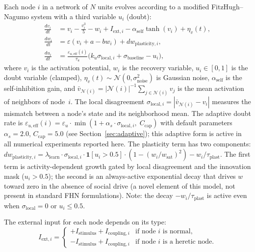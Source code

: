 ﻿\documentclass[11pt]{article}
\begin{document}
Each node $i$ in a network of $N$ units evolves according to a modified FitzHugh--Nagumo system with a third variable $u_i$ (doubt):
\begin{align}
\frac{dv_i}{dt} &= v_i - \frac{v_i^3}{5} - w_i + I_{\text{ext},i} - \alpha_{\text{self}} \tanh(v_i) + \eta_v(t), \label{eq:dv} \\
\frac{dw_i}{dt} &= \varepsilon(v_i + a - bw_i) + dw_{\text{plasticity},i}, \label{eq:dw} \\
\frac{du_i}{dt} &= \frac{\varepsilon_{u,\text{eff}}(i)}{\tau_u}\bigl(k_u \sigma_{\text{local},i} + \sigma_{\text{baseline}} - u_i\bigr), \label{eq:du}
\end{align}
where $v_i$ is the activation potential, $w_i$ is the recovery variable, $u_i \in [0, 1]$ is the doubt variable (clamped), $\eta_v(t) \sim \mathcal{N}(0, \sigma_{\text{noise}}^2)$ is Gaussian noise, $\alpha_{\text{self}}$ is the self-inhibition gain, and $\bar{v}_{\mathcal{N}(i)} = |\mathcal{N}(i)|^{-1} \sum_{j \in \mathcal{N}(i)} v_j$ is the mean activation of neighbors of node~$i$. The local disagreement $\sigma_{\text{local},i} = |\bar{v}_{\mathcal{N}(i)} - v_i|$ measures the mismatch between a node's state and its neighborhood mean. The adaptive doubt rate is $\varepsilon_{u,\text{eff}}(i) = \varepsilon_u \cdot \min(1 + \alpha_s \cdot \sigma_{\text{local},i},\; C_{\text{cap}})$ with default parameters $\alpha_s = 2.0$, $C_{\text{cap}} = 5.0$ (see Section~\ref{sec:adaptive}); this adaptive form is active in all numerical experiments reported here. The plasticity term has two components: $dw_{\text{plasticity},i} = \lambda_{\text{learn}} \cdot \sigma_{\text{local},i} \cdot \mathbf{1}[u_i > 0.5] \cdot (1 - (w_i/w_{\text{sat}})^2) - w_i/\tau_{\text{plast}}$. The first term is activity-dependent growth gated by local disagreement and the innovation mask ($u_i > 0.5$); the second is an always-active exponential decay that drives $w$ toward zero in the absence of social drive (a novel element of this model, not present in standard FHN formulations). Note: the decay $-w_i/\tau_{\text{plast}}$ is active even when $\sigma_{\text{local}} = 0$ or $u_i \leq 0.5$.

The external input for each node depends on its type:
\begin{equation}
I_{\text{ext},i} = \begin{cases}
+I_{\text{stimulus}} + I_{\text{coupling},i} & \text{if node } i \text{ is normal,} \\
-I_{\text{stimulus}} + I_{\text{coupling},i} & \text{if node } i \text{ is a heretic node.}
\end{cases}
\label{eq:stimulus}
\end{equation}
\end{document}
